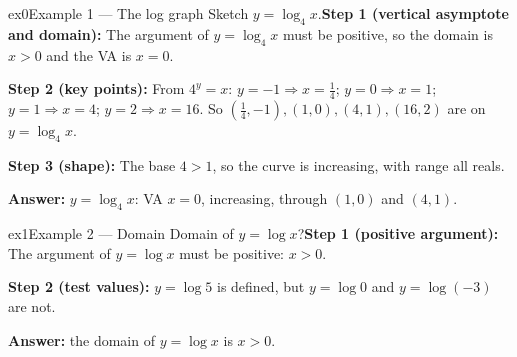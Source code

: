 \documentclass[11pt]{article}
\begin{document}
\begin{example}{ex0}{Example 1 --- The log graph}
Sketch $y=\log_4 x$.\soln \textbf{Step 1 (vertical asymptote and domain):} The argument of $y=\log_4x$ must be positive, so the domain is $x>0$ and the VA is $x=0$.

\textbf{Step 2 (key points):} From $4^y=x$: $y=-1\Rightarrow x=\tfrac14$; $y=0\Rightarrow x=1$; $y=1\Rightarrow x=4$; $y=2\Rightarrow x=16$. So $\left(\tfrac14,-1\right),(1,0),(4,1),(16,2)$ are on $y=\log_4x$.

\textbf{Step 3 (shape):} The base $4>1$, so the curve is increasing, with range all reals.

\textbf{Answer:} $y=\log_4x$: VA $x=0$, increasing, through $(1,0)$ and $(4,1)$.

\end{example}

\begin{example}{ex1}{Example 2 --- Domain}
Domain of $y=\log x$?\soln \textbf{Step 1 (positive argument):} The argument of $y=\log x$ must be positive: $x>0$.

\textbf{Step 2 (test values):} $y=\log5$ is defined, but $y=\log0$ and $y=\log(-3)$ are not.

\textbf{Answer:} the domain of $y=\log x$ is $x>0$.

\end{example}
\end{document}
